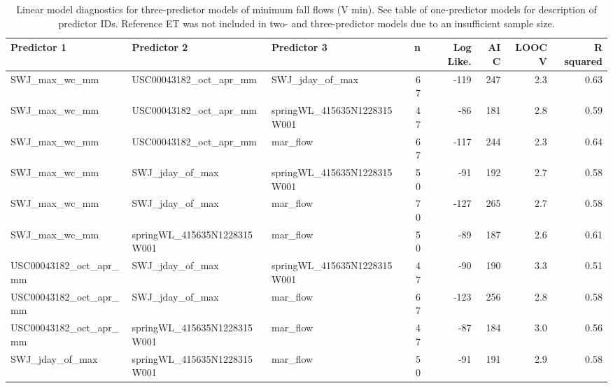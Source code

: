\documentclass[hess, manuscript]{copernicus}
\begin{document}
\begin{table}[ht]
\centering
\caption{Linear model diagnostics for three-predictor models of minimum fall flows (V min). See table of one-predictor models for description of predictor IDs. Reference ET was not included in two- and three-predictor models due to an insufficient sample size.} 
\label{tab:vmin_tab_3pred}
\begingroup\fontsize{8pt}{9pt}\selectfont
\begin{tabular}{lllrrrrr}
  \hline
Predictor 1 & Predictor 2 & Predictor 3 & n & Log Like. & AIC & LOOCV & R squared \\ 
  \hline
SWJ\_max\_wc\_mm & USC00043182\_oct\_apr\_mm & SWJ\_jday\_of\_max & 67 & -119 & 247 & 2.3 & 0.63 \\ 
  SWJ\_max\_wc\_mm & USC00043182\_oct\_apr\_mm & springWL\_415635N1228315W001 & 47 & -86 & 181 & 2.8 & 0.59 \\ 
  SWJ\_max\_wc\_mm & USC00043182\_oct\_apr\_mm & mar\_flow & 67 & -117 & 244 & 2.3 & 0.64 \\ 
  SWJ\_max\_wc\_mm & SWJ\_jday\_of\_max & springWL\_415635N1228315W001 & 50 & -91 & 192 & 2.7 & 0.58 \\ 
  SWJ\_max\_wc\_mm & SWJ\_jday\_of\_max & mar\_flow & 70 & -127 & 265 & 2.7 & 0.58 \\ 
  SWJ\_max\_wc\_mm & springWL\_415635N1228315W001 & mar\_flow & 50 & -89 & 187 & 2.6 & 0.61 \\ 
  USC00043182\_oct\_apr\_mm & SWJ\_jday\_of\_max & springWL\_415635N1228315W001 & 47 & -90 & 190 & 3.3 & 0.51 \\ 
  USC00043182\_oct\_apr\_mm & SWJ\_jday\_of\_max & mar\_flow & 67 & -123 & 256 & 2.8 & 0.58 \\ 
  USC00043182\_oct\_apr\_mm & springWL\_415635N1228315W001 & mar\_flow & 47 & -87 & 184 & 3.0 & 0.56 \\ 
  SWJ\_jday\_of\_max & springWL\_415635N1228315W001 & mar\_flow & 50 & -91 & 191 & 2.9 & 0.58 \\ 
   \hline
\end{tabular}
\endgroup
\end{table}
\end{document}

